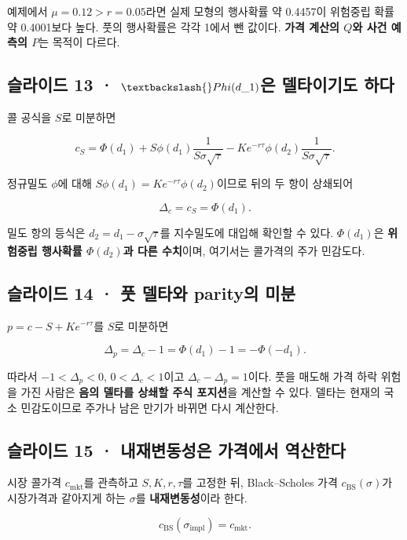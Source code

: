 \documentclass[11pt,a4paper]{article}
\begin{document}
예제에서 $\mu=0.12>r=0.05$라면 실제 모형의 행사확률 약 0.4457이 위험중립 확률 약 0.4001보다 높다. 풋의 행사확률은 각각 1에서 뺀 값이다. \textbf{가격 계산의 $Q$와 사건 예측의 $P$}는 목적이 다르다.\par

\subsection{슬라이드 13 · $\textbackslash{}Phi(d\_1)$은 델타이기도 하다}
콜 공식을 $S$로 미분하면\par

\[
c_S=\Phi(d_1)+S\phi(d_1)\frac{1}{S\sigma\sqrt\tau}
-Ke^{-r\tau}\phi(d_2)\frac{1}{S\sigma\sqrt\tau}.
\]

정규밀도 $\phi$에 대해 $S\phi(d_1)=Ke^{-r\tau}\phi(d_2)$이므로 뒤의 두 항이 상쇄되어\par

\[
\Delta_c=c_S=\Phi(d_1).
\]

밀도 항의 등식은 $d_2=d_1-\sigma\sqrt\tau$를 지수밀도에 대입해 확인할 수 있다. $\Phi(d_1)$은 \textbf{위험중립 행사확률 $\Phi(d_2)$과 다른 수치}이며, 여기서는 콜가격의 주가 민감도다.\par

\subsection{슬라이드 14 · 풋 델타와 parity의 미분}
$p=c-S+Ke^{-r\tau}$를 $S$로 미분하면\par

\[
\Delta_p=\Delta_c-1=\Phi(d_1)-1=-\Phi(-d_1).
\]

따라서 $-1<\Delta_p<0$, $0<\Delta_c<1$이고 $\Delta_c-\Delta_p=1$이다. 풋을 매도해 가격 하락 위험을 가진 사람은 \textbf{음의 델타를 상쇄할 주식 포지션}을 계산할 수 있다. 델타는 현재의 국소 민감도이므로 주가나 남은 만기가 바뀌면 다시 계산한다.\par

\subsection{슬라이드 15 · 내재변동성은 가격에서 역산한다}
시장 콜가격 $c_{\mathrm{mkt}}$를 관측하고 $S,K,r,\tau$를 고정한 뒤, Black–Scholes 가격 $c_{\mathrm{BS}}(\sigma)$가 시장가격과 같아지게 하는 $\sigma$를 \textbf{내재변동성}이라 한다.\par

\[
c_{\mathrm{BS}}(\sigma_{\mathrm{impl}})=c_{\mathrm{mkt}}.
\]
\end{document}
